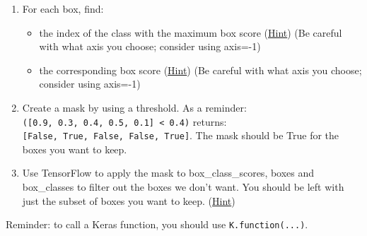 \documentclass[11pt]{article}
\providecommand{\tightlist}{%
      \setlength{\itemsep}{0pt}\setlength{\parskip}{0pt}}
\begin{document}
\begin{enumerate}
\def\labelenumi{\arabic{enumi}.}
\setcounter{enumi}{1}
\tightlist
\item
  For each box, find:

  \begin{itemize}
  \tightlist
  \item
    the index of the class with the maximum box score
    (\href{https://keras.io/backend/\#argmax}{Hint}) (Be careful with
    what axis you choose; consider using axis=-1)
  \item
    the corresponding box score
    (\href{https://keras.io/backend/\#max}{Hint}) (Be careful with what
    axis you choose; consider using axis=-1)
  \end{itemize}
\item
  Create a mask by using a threshold. As a reminder:
  \texttt{({[}0.9,\ 0.3,\ 0.4,\ 0.5,\ 0.1{]}\ \textless{}\ 0.4)}
  returns: \texttt{{[}False,\ True,\ False,\ False,\ True{]}}. The mask
  should be True for the boxes you want to keep.
\item
  Use TensorFlow to apply the mask to box\_class\_scores, boxes and
  box\_classes to filter out the boxes we don't want. You should be left
  with just the subset of boxes you want to keep.
  (\href{https://www.tensorflow.org/api_docs/python/tf/boolean_mask}{Hint})
\end{enumerate}

Reminder: to call a Keras function, you should use
\texttt{K.function(...)}.
\end{document}
